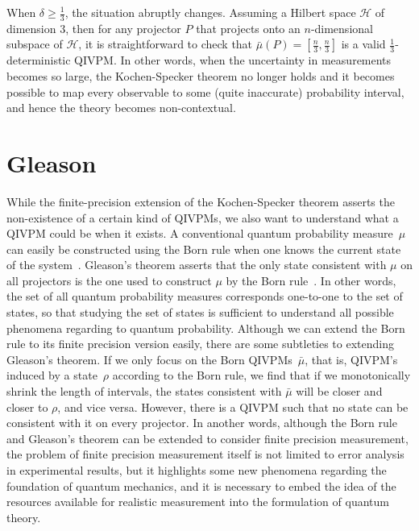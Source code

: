 \documentclass[english,reprint, aps, prl,superscriptaddress, showpacs,
showkeys, longbibliography, amsmath, amssymb, floatfix]{revtex4-1}
\theoremstyle{plain}
\theoremstyle{definition}
\newcommand{\Hilb}{\mathcal{H}}
\begin{document}
When $\delta \ge \frac{1}{3}$, the situation abruptly
changes. Assuming a Hilbert space $\Hilb$ of dimension $3$, then for
any projector $P$ that projects onto an $n$-dimensional subspace of
$\Hilb$, it is straightforward to check that
$\bar{\mu}\left(P\right)=\left[\frac{n}{3},\frac{n}{3}\right]$ is a valid
$\frac{1}{3}$-deterministic QIVPM. In other words, when the
uncertainty in measurements becomes so large, the Kochen-Specker
theorem no longer holds and it becomes possible to map every
observable to some (quite inaccurate) probability interval, and hence
the theory becomes non-contextual.

\section{Gleason}

\label{sec:Gleason}

While the finite-precision extension of the Kochen-Specker theorem
asserts the non-existence of a certain kind of QIVPMs, we also want
to understand what a QIVPM could be when it exists. A conventional
quantum probability measure~$\mu$ can easily be constructed using
the Born rule when one knows the current state of the system~\citep{Born1983,peres1995quantum,544199,Jaeger2007}.
Gleason's theorem asserts that the only state consistent with $\mu$
on all projectors is the one used to construct $\mu$ by the Born
rule~\citep{gleason1957,Redhead1987-REDINA,peres1995quantum}. In
other words, the set of all quantum probability measures corresponds
one-to-one to the set of states, so that studying the set of states
is sufficient to understand all possible phenomena regarding to quantum
probability. Although we can extend the Born rule to its finite precision
version easily, there are some subtleties to extending Gleason's theorem.
If we only focus on the Born QIVPMs~$\bar{\mu}$, that is, QIVPM's
induced by a state~$\rho$ according to the Born rule, we find that
if we monotonically shrink the length of intervals, the states consistent
with $\bar{\mu}$ will be closer and closer to $\rho$, and vice versa.
However, there is a QIVPM such that no state can be consistent with
it on every projector. In another words, although the Born rule and
Gleason's theorem can be extended to consider finite precision measurement,
the problem of finite precision measurement itself is not limited
to error analysis in experimental results, but it highlights some
new phenomena regarding the foundation of quantum mechanics, and it
is necessary to embed the idea of the resources available for realistic
measurement into the formulation of quantum theory.
\end{document}
